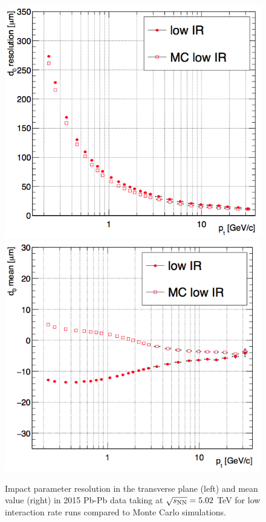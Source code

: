 \begin{figure}[!htb]
 \begin{center}
\includegraphics[width=.49\textwidth]{./FigCap5/d0Reso.png}
\includegraphics[width=.49\textwidth]{./FigCap5/d0Mean.png}
\end{center}
 \caption{Impact parameter resolution in the transverse plane (left) and mean value (right) in 2015 Pb-Pb data taking at $\sqrt{s_{\rm NN}} = 5.02$ TeV for low interaction rate runs compared to Monte Carlo simulations.}
 \label{fig:d0}
\end{figure}



